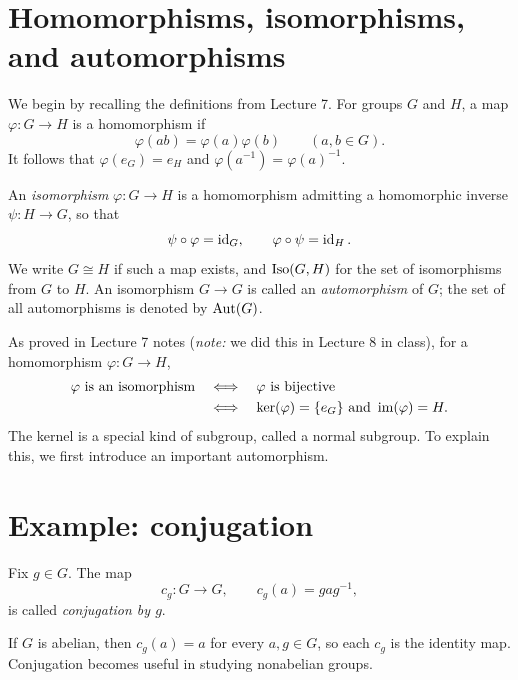 \documentclass[reqno,11pt]{amsart}
\begin{document}
\makelecturetitle

\section{Homomorphisms, isomorphisms, and automorphisms}

We begin by recalling the definitions from Lecture 7. For groups $G$ and $H$,
a map $\varphi:G\to H$ is a homomorphism if
\[
  \varphi(ab)=\varphi(a)\varphi(b)\qquad(a,b\in G).
\]
It follows that $\varphi(e_G)=e_H$ and
$\varphi(a^{-1})=\varphi(a)^{-1}$. 

\begin{define}
An \emph{isomorphism} $\varphi:G\to H$ is a homomorphism admitting a
homomorphic inverse $\psi:H\to G$, so that
\[
  \psi\circ\varphi=\operatorname{id}_G,\qquad \varphi\circ\psi=\operatorname{id}_H.
\]
We write $G\cong H$ if such a map exists, and $\operatorname{Iso}(G,H)$ for the set of
isomorphisms from $G$ to $H$.
An isomorphism $G\to G$ is called an \emph{automorphism} of $G$; the set
of all automorphisms is denoted by $\operatorname{Aut}(G)$.
\end{define}

As proved in Lecture 7 notes (\textit{note:} we did this in Lecture 8 in class), for a homomorphism $\varphi:G\to H$,
\begin{align*}
  \varphi\text{ is an isomorphism}
  &\quad\Longleftrightarrow\quad \varphi\text{ is bijective}\\
  &\quad\Longleftrightarrow\quad
  \ker(\varphi)=\{e_G\}\text{ and }\operatorname{im}(\varphi)=H.
\end{align*}
The kernel is a special kind of subgroup, called a normal subgroup.
To explain this, we first introduce an important automorphism.

\section{Example: conjugation}

\begin{define}[Conjugation]
Fix $g\in G$. The map
\begin{equation}
  c_g:G\longrightarrow G,\qquad c_g(a)=gag^{-1},
\end{equation}
is called \emph{conjugation by $g$}.
\end{define}

If $G$ is abelian, then $c_g(a)=a$ for every $a,g\in G$, so each $c_g$
is the identity map. Conjugation becomes useful in studying nonabelian groups.
\end{document}
